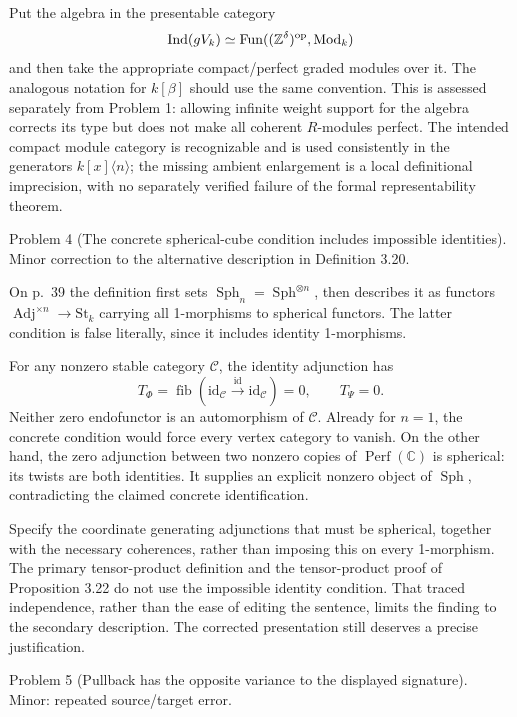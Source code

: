 \documentclass[10pt]{article}
\begin{document}
Put the algebra in the presentable category \[\operatorname{Ind}(gV_k)
       \simeq \operatorname{Fun}((\mathbb Z^\delta)^{\rm op},
                                 \operatorname{Mod}_k)\] and then take the appropriate compact/perfect graded modules over it. The analogous notation for \(k[\beta]\) should use the same convention. This is assessed separately from Problem 1: allowing infinite weight support for the algebra corrects its type but does not make all coherent \(R\)-modules perfect. The intended compact module category is recognizable and is used consistently in the generators \(k[x]\langle n\rangle\); the missing ambient enlargement is a local definitional imprecision, with no separately verified failure of the formal representability theorem.\par
Problem 4 (The concrete spherical-cube condition includes impossible identities).  Minor correction to the alternative description in Definition 3.20.\par
On p. 39 the definition first sets \(\operatorname{Sph}_n=\operatorname{Sph}^{\otimes n}\), then describes it as functors \(\operatorname{Adj}^{\times n}\to\mathrm{St}_k\) carrying all 1-morphisms to spherical functors. The latter condition is false literally, since it includes identity 1-morphisms.\par
For any nonzero stable category \(\mathcal C\), the identity adjunction has \[T_\Phi=\operatorname{fib}(\mathrm{id}_{\mathcal C}
                           \xrightarrow{\mathrm{id}}\mathrm{id}_{\mathcal C})=0,
 \qquad T_\Psi=0.\] Neither zero endofunctor is an automorphism of \(\mathcal C\). Already for \(n=1\), the concrete condition would force every vertex category to vanish. On the other hand, the zero adjunction between two nonzero copies of \(\operatorname{Perf}(\mathbb C)\) is spherical: its twists are both identities. It supplies an explicit nonzero object of \(\operatorname{Sph}\), contradicting the claimed concrete identification.\par
Specify the coordinate generating adjunctions that must be spherical, together with the necessary coherences, rather than imposing this on every 1-morphism. The primary tensor-product definition and the tensor-product proof of Proposition 3.22 do not use the impossible identity condition. That traced independence, rather than the ease of editing the sentence, limits the finding to the secondary description. The corrected presentation still deserves a precise justification.\par
Problem 5 (Pullback has the opposite variance to the displayed signature).  Minor: repeated source/target error.\par
\end{document}
